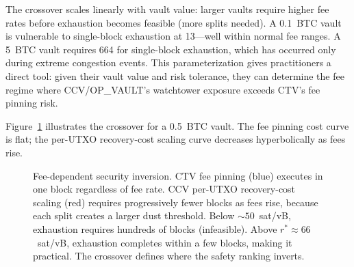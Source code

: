 The crossover scales linearly with vault value: larger vaults require higher fee
rates before exhaustion becomes feasible (more splits needed). A 0.1~BTC vault is
vulnerable to single-block exhaustion at 13\satvB{}---well within normal fee ranges.
A 5~BTC vault requires 664\satvB{} for single-block exhaustion, which has occurred
only during extreme congestion events. This parameterization gives practitioners a
direct tool: given their vault value and risk tolerance, they can determine the fee
regime where CCV/OP\_VAULT's watchtower exposure exceeds CTV's fee pinning risk.

Figure~\ref{fig:fee_inversion} illustrates the crossover for a 0.5~BTC vault.
The fee pinning cost curve is flat; the per-UTXO recovery-cost scaling curve decreases
hyperbolically as fees rise.

\begin{figure}[t]
\centering
{}
\caption{Fee-dependent security inversion. CTV fee pinning (blue) executes in
one block regardless of fee rate. CCV per-UTXO recovery-cost scaling (red) requires
progressively fewer blocks as fees rise, because each split creates a larger
dust threshold. Below ${\sim}50$~sat/vB, exhaustion requires hundreds of blocks
(infeasible). Above $r^* \approx 66$~sat/vB, exhaustion completes within a few
blocks, making it practical. The crossover defines where the safety ranking inverts.}
\label{fig:fee_inversion}
\end{figure}

